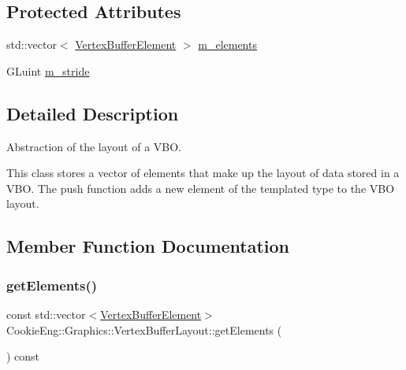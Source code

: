 \subsection*{Protected Attributes}
\begin{DoxyCompactItemize}
\item 
std\+::vector$<$ \hyperlink{struct_cookie_eng_1_1_graphics_1_1_vertex_buffer_element}{Vertex\+Buffer\+Element} $>$ \hyperlink{class_cookie_eng_1_1_graphics_1_1_vertex_buffer_layout_a7986bf1ce59d1ffa1dc31613014aa2e7}{m\+\_\+elements}
\item 
G\+Luint \hyperlink{class_cookie_eng_1_1_graphics_1_1_vertex_buffer_layout_a972f0e9224f28b13be7d959449423308}{m\+\_\+stride}
\end{DoxyCompactItemize}


\subsection{Detailed Description}
Abstraction of the layout of a V\+BO. 

This class stores a vector of elements that make up the layout of data stored in a V\+BO. The push function adds a new element of the templated type to the V\+BO layout. 

\subsection{Member Function Documentation}
\mbox{\label{class_cookie_eng_1_1_graphics_1_1_vertex_buffer_layout_a082cc08b182cabe19998ae522c0466be}} 
\subsubsection{\texorpdfstring{get\+Elements()}{getElements()}}
{\footnotesize\ttfamily const std\+::vector$<$\hyperlink{struct_cookie_eng_1_1_graphics_1_1_vertex_buffer_element}{Vertex\+Buffer\+Element}$>$ Cookie\+Eng\+::\+Graphics\+::\+Vertex\+Buffer\+Layout\+::get\+Elements (\begin{DoxyParamCaption}{ }\end{DoxyParamCaption}) const\hspace{0.3cm}{\ttfamily [inline]}}



